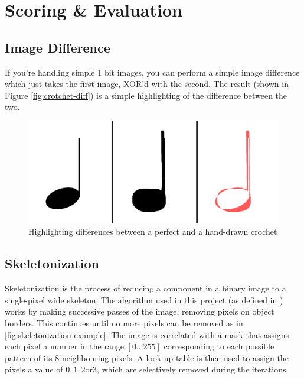 \section{Scoring \& Evaluation}

\subsection{Image Difference}

If you're handling simple 1 bit images, you can perform a simple image difference which just takes the first image, XOR'd with the second. The result (shown in Figure \cref{fig:crotchet-diff}) is a simple highlighting of the difference between the two.

\begin{figure}[h!]
  \centering
  \includegraphics[width=\linewidth]{gfx/crochet-all.png}
  \caption{Highlighting differences between a perfect and a hand-drawn crochet}
  \label{crotchet-diff}
\end{figure}


\subsection{Skeletonization}
\label{sec:skeletonization}

Skeletonization is the process of reducing a component in a binary image to a single-pixel wide skeleton. The algorithm used in this project (as defined in \cite{zhang1984fast}) works by making successive passes of the image, removing pixels on object borders. This continues until no more pixels can be removed as in \cref{fig:skeletonization-example}.  The image is correlated with a mask that assigns each pixel a number in the range $[0...255]$ corresponding to each possible pattern of its $8$ neighbouring pixels. A look up table is then used to assign the pixels a value of $0, 1, 2 \text{or} 3$, which are selectively removed during the iterations.

